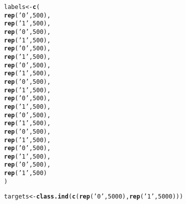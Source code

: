 \documentclass[titlepage]{article}\usepackage[]{graphicx}\usepackage[]{color}
\makeatletter
\newcommand{\hlnum}[1]{\textcolor[rgb]{0.686,0.059,0.569}{#1}}%
\newcommand{\hlstr}[1]{\textcolor[rgb]{0.192,0.494,0.8}{#1}}%
\newcommand{\hlstd}[1]{\textcolor[rgb]{0.345,0.345,0.345}{#1}}%
\newcommand{\hlkwb}[1]{\textcolor[rgb]{0.69,0.353,0.396}{#1}}%
\newcommand{\hlkwd}[1]{\textcolor[rgb]{0.737,0.353,0.396}{\textbf{#1}}}%
\newenvironment{kframe}{%
 \def\at@end@of@kframe{}%
 \ifinner\ifhmode%
  \def\at@end@of@kframe{\end{minipage}}%
  \begin{minipage}{\columnwidth}%
 \fi\fi%
 \def\FrameCommand##1{\hskip\@totalleftmargin \hskip-\fboxsep
 \colorbox{shadecolor}{##1}\hskip-\fboxsep
     \hskip-\linewidth \hskip-\@totalleftmargin \hskip\columnwidth}%
 \MakeFramed {\advance\hsize-\width
   \@totalleftmargin\z@ \linewidth\hsize
   \@setminipage}}%
 {\par\unskip\endMakeFramed%
 \at@end@of@kframe}
\newenvironment{knitrout}{}{} %
\makeatother
\begin{document}
\begin{knitrout}
\color{fgcolor}\begin{kframe}
\begin{alltt}
\hlstd{labels} \hlkwb{<-} \hlkwd{c}\hlstd{(}
  \hlkwd{rep}\hlstd{(}\hlstr{'0'}\hlstd{,}\hlnum{500}\hlstd{),}
        \hlkwd{rep}\hlstd{(}\hlstr{'1'}\hlstd{,}\hlnum{500}\hlstd{),}
        \hlkwd{rep}\hlstd{(}\hlstr{'0'}\hlstd{,}\hlnum{500}\hlstd{),}
        \hlkwd{rep}\hlstd{(}\hlstr{'1'}\hlstd{,}\hlnum{500}\hlstd{),}
        \hlkwd{rep}\hlstd{(}\hlstr{'0'}\hlstd{,}\hlnum{500}\hlstd{),}
        \hlkwd{rep}\hlstd{(}\hlstr{'1'}\hlstd{,}\hlnum{500}\hlstd{),}
        \hlkwd{rep}\hlstd{(}\hlstr{'0'}\hlstd{,}\hlnum{500}\hlstd{),}
        \hlkwd{rep}\hlstd{(}\hlstr{'1'}\hlstd{,}\hlnum{500}\hlstd{),}
        \hlkwd{rep}\hlstd{(}\hlstr{'0'}\hlstd{,}\hlnum{500}\hlstd{),}
        \hlkwd{rep}\hlstd{(}\hlstr{'1'}\hlstd{,}\hlnum{500}\hlstd{),}
        \hlkwd{rep}\hlstd{(}\hlstr{'0'}\hlstd{,}\hlnum{500}\hlstd{),}
        \hlkwd{rep}\hlstd{(}\hlstr{'1'}\hlstd{,}\hlnum{500}\hlstd{),}
        \hlkwd{rep}\hlstd{(}\hlstr{'0'}\hlstd{,}\hlnum{500}\hlstd{),}
        \hlkwd{rep}\hlstd{(}\hlstr{'1'}\hlstd{,}\hlnum{500}\hlstd{),}
        \hlkwd{rep}\hlstd{(}\hlstr{'0'}\hlstd{,}\hlnum{500}\hlstd{),}
        \hlkwd{rep}\hlstd{(}\hlstr{'1'}\hlstd{,}\hlnum{500}\hlstd{),}
        \hlkwd{rep}\hlstd{(}\hlstr{'0'}\hlstd{,}\hlnum{500}\hlstd{),}
        \hlkwd{rep}\hlstd{(}\hlstr{'1'}\hlstd{,}\hlnum{500}\hlstd{),}
        \hlkwd{rep}\hlstd{(}\hlstr{'0'}\hlstd{,}\hlnum{500}\hlstd{),}
        \hlkwd{rep}\hlstd{(}\hlstr{'1'}\hlstd{,}\hlnum{500}\hlstd{)}
\hlstd{)}

\hlstd{targets} \hlkwb{<-} \hlkwd{class.ind}\hlstd{(}\hlkwd{c}\hlstd{(}\hlkwd{rep}\hlstd{(}\hlstr{'0'}\hlstd{,} \hlnum{5000}\hlstd{),} \hlkwd{rep}\hlstd{(}\hlstr{'1'}\hlstd{,}\hlnum{5000}\hlstd{)))}
\end{alltt}
\end{kframe}
\end{knitrout}
\end{document}
